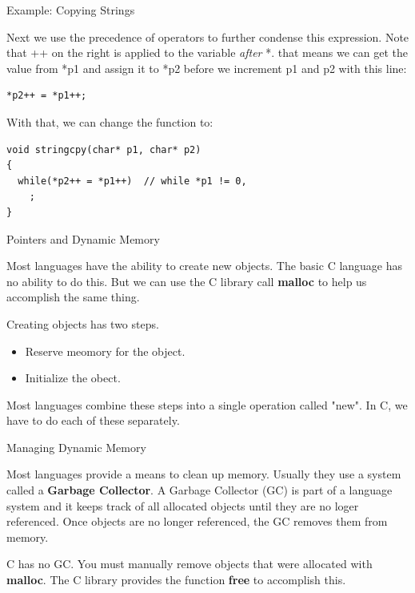 \documentclass[10pt]{beamer}
\begin{document}
\begin{frame}[fragile]{Example: Copying Strings}

Next we use the precedence of operators to further condense this expression.  Note that ++ on the right is applied to the variable \textit{after} *.  that means we can get the value from *p1 and assign it to *p2 before we increment p1 and p2 with this line:

\begin{verbatim}
*p2++ = *p1++;
\end{verbatim}
With that, we can change the function to:
\begin{verbatim}
void stringcpy(char* p1, char* p2)
{
  while(*p2++ = *p1++)  // while *p1 != 0,
    ;
}
\end{verbatim}

\end{frame}
\begin{frame}[fragile]{Pointers and Dynamic Memory}

Most languages have the ability to create new objects.  The basic C language has no ability to do this.  But we can use the C library call \textbf{malloc} to help us accomplish the same thing.

Creating objects has two steps.  
\begin{itemize}
\item Reserve meomory for the object.
\item Initialize the obect.
\end{itemize}

Most languages combine these steps into a single operation called "new".  In C, we have to do each of these separately.

\end{frame}
\begin{frame}[fragile]{Managing Dynamic Memory}

Most languages provide a means to clean up memory.  Usually they use a system called a \textbf{Garbage Collector}. A Garbage Collector (GC) is part of a language system and it keeps track of all allocated objects until they are no loger referenced.  Once objects are no longer referenced, the GC removes them from memory.  

C has no GC.  You must manually remove objects that were allocated with \textbf{malloc}.  The C library provides the function \textbf{free} to accomplish this.

\end{frame}
\end{document}
